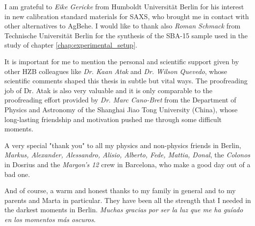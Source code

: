 \noindent I am grateful to \emph{Eike Gericke} from Humboldt Universität Berlin for his interest in new calibration standard materials for SAXS, who brought me in contact with other alternatives to AgBehe. I would like to thank also \emph{Roman Schmack} from Technische Universität Berlin for the synthesis of the SBA-15 sample used in the study of chapter \ref{chap:experimental_setup}.
\vspace{2ex}

\noindent It is important for me to mention the personal and scientific support given by other HZB colleagues like \emph{Dr. Kaan Atak} and \emph{Dr. Wilson Quevedo}, whose scientific comments shaped this thesis in subtle but vital ways. The proofreading job of Dr. Atak is also very valuable and it is only comparable to the proofreading effort provided by \emph{Dr. Marc Cano-Bret} from the Department of Physics and Astronomy of the Shanghai Jiao Tong University (China), whose long-lasting friendship and motivation pushed me through some difficult moments.
\vspace{2ex}

\noindent A very special "thank you" to all my physics and non-physics friends in Berlin, \emph{Markus, Alexander, Alessandro, Alisio, Alberto, Fede, Mattia, Donal}, the \emph{Colonos} in Dosrius and the \emph{Margon's 12} crew in Barcelona, who make a good day out of a bad one.
\vspace{2ex}

\noindent And of course, a warm and honest thanks to my family in general and to my parents and Marta in particular. They have been all the strength that I needed in the darkest moments in Berlin. \emph{Muchas gracias por ser la luz que me ha gu\'{i}ado en los momentos m\'{a}s oscuros}.

\cleardoublepage
